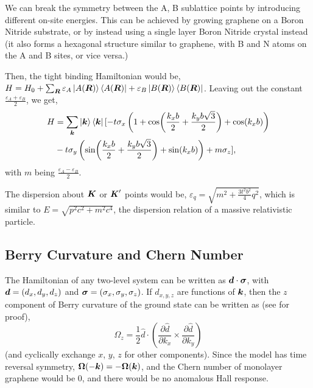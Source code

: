\documentclass{report}
\renewcommand\vec[1]{\ensuremath\boldsymbol{#1}} %
\begin{document}
We can break the symmetry between the A, B sublattice points by introducing different on-site energies. This can be achieved by growing graphene on a Boron Nitride substrate, or by instead using a single layer Boron Nitride crystal instead (it also forms a hexagonal structure similar to graphene, with B and N atoms on the A and B sites, or vice versa.)

Then, the tight binding Hamiltonian would be,
$H = H_0 + \sum_{\vec{R}} \varepsilon_A \ket{A(\vec{R})} \bra{A(\vec{R})} + \varepsilon_B \ket{B(\vec{R})} \bra{B(\vec{R})}$. Leaving out the constant  $\frac{\varepsilon_A + \varepsilon_B}{2}$, we get,
\begin{equation}\label{Eq:GrapheneHopping}
	\begin{aligned}
H &=  \sum_{\vec{k}} \ket{\vec{k}}\bra{\vec{k}} [-t \sigma_x \left(1 + \cos(\frac{k_x b}{2} + \frac{k_y b \sqrt{3}}{2}) + \cos(k_x b)\right) \\
& -t \sigma_y \left( \sin(\frac{k_x b}{2}  + \frac{k_y b \sqrt{3}}{2}) + \sin(k_x b)\right)  + m \sigma_z ],
	\end{aligned}
\end{equation} with $m$ being $\frac{\varepsilon_A - \varepsilon_B}{2}$.

The dispersion about $\vec{K}$ or $\vec{K}'$ points would be, $\varepsilon_{q} = \sqrt{m^2 + \frac{3 t^2 b^2}{4} q^2} $, which is similar to $E = \sqrt{p^2 c^2 + m^2 c^4}$, the dispersion relation of a massive relativistic particle.

\subsection{Berry Curvature and Chern Number}
The Hamiltonian of any two-level system can be written as $\vec{d} \cdot \vec{\sigma}$, with $\vec{d} = (d_x, d_y, d_z)$ and $\vec{\sigma} = (\sigma_x, \sigma_y, \sigma_z)$. If $d_{x,y,z}$ are functions of $\vec{k}$, then the $z$ component of Berry curvature of the ground state can be written as (see \cite{shankar2018topological} for proof),
\begin{equation}\label{Eq:BerryTwoBandFormula}
	\Omega_z = 
	\frac{1}{2} \hat{d} \cdot (\frac{\partial \hat{d}}{\partial k_x} \times \frac{\partial \hat{d}}{\partial k_y} )
\end{equation}
(and cyclically exchange $x$, $y$, $z$ for other components).
Since the model has time reversal symmetry, $\vec{\Omega}(-\vec{k}) = -\vec{\Omega}(\vec{k})$, and the Chern number of monolayer graphene would be $0$, and there would be no anomalous Hall response.
\end{document}
